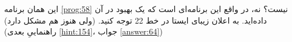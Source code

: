 \section{}
\paragraph{}\label{hint:322}
این همان برنامه \ref{prog:58} نیست؟ نه، در واقع این برنامه‌ای است که یک بهبود در آن داده‌اید. به اعلان زیبای ایستا در خط 22 توجه کنید. (ولی هنوز هم مشکل دارد) (راهنماییِ بعدی \ref{hint:154}، جواب \ref{answer:64})